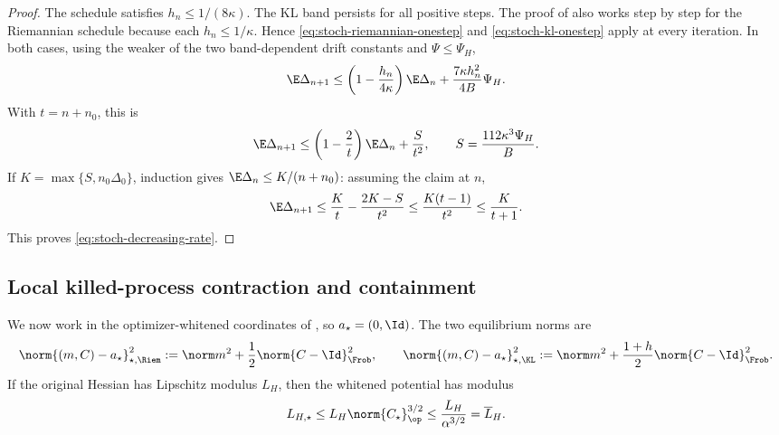 \begin{proof}
The schedule satisfies \(h_n\leq1/(8\kappa)\).  The KL band persists for
all positive steps.  The proof of
 also works step by step for the
Riemannian schedule because each \(h_n\leq1/\kappa\).  Hence
\eqref{eq:stoch-riemannian-onestep} and
\eqref{eq:stoch-kl-onestep} apply at every iteration.  In both cases, using
the weaker of the two band-dependent drift constants and
\(\Psi\leq\Psi_H\),
\begin{equation}
  \E\Delta_{n+1}
  \leq
  \left(1-\frac{h_n}{4\kappa}\right)\E\Delta_n
  +\frac{7\kappa h_n^2}{4B}\Psi_H.
  \label{eq:stoch-decreasing-recursion}
\end{equation}
With \(t=n+n_0\), this is
\[
  \E\Delta_{n+1}
  \leq\left(1-\frac2t\right)\E\Delta_n+\frac S{t^2},
  \qquad
  S=\frac{112\kappa^3\Psi_H}{B}.
\]
If \(K=\max\{S,n_0\Delta_0\}\), induction gives
\(\E\Delta_n\leq K/(n+n_0)\): assuming the claim at \(n\),
\[
  \E\Delta_{n+1}
  \leq \frac Kt-\frac{2K-S}{t^2}
  \leq \frac{K(t-1)}{t^2}
  \leq \frac K{t+1}.
\]
This proves \eqref{eq:stoch-decreasing-rate}.
\end{proof}

\subsection{Local killed-process contraction and containment}
\label{sec:stoch-local}

We now work in the optimizer-whitened coordinates of , so
\(a_\star=(0,\Id)\).  The two equilibrium norms are
\begin{equation}
  \norm{(m,C)-a_\star}_{\star,\Riem}^2
  :=\norm m^2+\frac12\norm{C-\Id}_{\Frob}^2,
  \qquad
  \norm{(m,C)-a_\star}_{\star,\KL}^2
  :=\norm m^2+\frac{1+h}{2}\norm{C-\Id}_{\Frob}^2.
  \label{eq:stoch-local-norms}
\end{equation}
If the original Hessian has Lipschitz modulus \(L_H\), then the whitened
potential has modulus
\begin{equation}
  L_{H,\star}
  \leq L_H\norm{C_\star}_{\op}^{3/2}
  \leq \frac{L_H}{\alpha^{3/2}}
  =\overline L_H.
  \label{eq:stoch-whitened-Hlip}
\end{equation}

